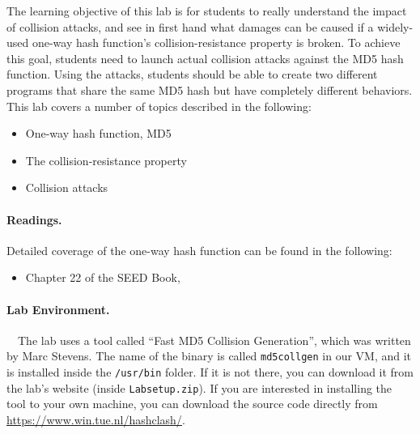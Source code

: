 The learning objective of this lab is for students to really
understand the impact of collision attacks, and see in first hand what
damages can be caused if a widely-used one-way hash function's
collision-resistance property is broken. To achieve this goal, students
need to launch actual collision attacks against the MD5 hash function.
Using the attacks, students should be able to create two different programs
that share the same MD5 hash but have completely different behaviors.
This lab covers a number of topics described in the following:

\begin{itemize}[noitemsep]
\item One-way hash function, MD5
\item The collision-resistance property
\item Collision attacks
\end{itemize}


\paragraph{Readings.}
Detailed coverage of the one-way hash function can be found in the following:

\begin{itemize}
\item Chapter 22 of the SEED Book, \seedbook
\end{itemize}



\paragraph{Lab Environment.} \seedenvironmentB \ \ 
The lab uses a tool 
called ``Fast MD5 Collision Generation'', which was written by Marc Stevens. 
The name of the binary is called \texttt{md5collgen} in our VM, and it is 
installed inside the \texttt{/usr/bin} folder. If it is not there, you
can download it from the lab's website (inside \texttt{Labsetup.zip}). 
If you are interested in installing the tool to your own machine, you
can download the source code directly from
\url{https://www.win.tue.nl/hashclash/}.



